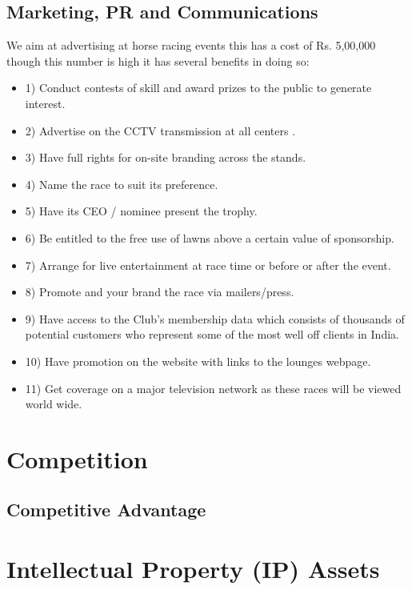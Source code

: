 \documentclass[11pt]{article}
\begin{document}
  \subsection{Marketing, PR and Communications}
We aim at advertising at horse racing events this has a cost of Rs. 5,00,000 though this number is high it has several benefits in doing so:
\begin{itemize}
\item 1) Conduct contests of skill and award prizes to the public to generate interest. 
\item 2) Advertise on the CCTV transmission at all centers .
\item 3) Have full rights for on-site branding across the stands.
\item 4) Name the race to suit its preference.
\item 5) Have its CEO / nominee present the trophy.
\item 6) Be entitled to the free use of lawns above a certain value of sponsorship.
\item 7) Arrange for live entertainment at race time or before or after the event.
\item 8) Promote and your brand the race via mailers/press.
\item 9) Have access to the Club's membership data which consists of thousands of potential customers who represent some of the most well off clients in India.
\item 10) Have promotion on the website with links to the lounges webpage.
\item 11) Get coverage on a major television network as these races will be viewed world wide.

\end{itemize}
\section{Competition}
  \subsection{Competitive Advantage}
\section{Intellectual Property (IP) Assets}
\end{document}

